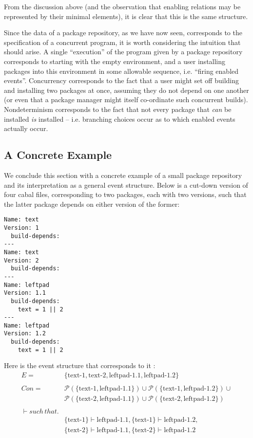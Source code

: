 \documentclass[hoptionsi,review,screen,format=sigconf]{acmart}
\theoremstyle{definition}
\newcommand{\Pc}{\mathcal{P}}
\begin{document}
From the discussion above (and the observation that enabling relations may be represented by their minimal elements), it is clear that this is the same structure.

Since the data of a package repository, as we have now seen, corresponds to the specification of a concurrent program, it is worth considering the intuition that should arise. A single ``execution'' of the program given by a package repository corresponds to starting with the empty environment, and a user installing packages into this environment in some allowable sequence, i.e. ``firing enabled events''. Concurrency corresponds to the fact that a user might set off building and installing two packages at once, assuming they do not depend on one another (or even that a package manager might itself co-ordinate such concurrent builds). Nondeterminism corresponds to the fact that not every package that \textit{can} be installed \textit{is} installed -- i.e. branching choices occur as to which enabled events actually occur.

\subsection{A Concrete Example}

We conclude this section with a concrete example of a small package repository and its interpretation as a general event structure. Below is a cut-down version of four cabal files, corresponding to two packages, each with two versions, such that the latter package depends on either version of the former:

\begin{verbatim}
Name: text
Version: 1
  build-depends: 
---
Name: text
Version: 2
  build-depends: 
---
Name: leftpad
Version: 1.1
  build-depends: 
    text = 1 || 2
---
Name: leftpad
Version: 1.2
  build-depends: 
    text = 1 || 2
\end{verbatim}


Here is the event structure that corresponds to it :
\begin{equation*}
\begin{aligned}
E  = & \{\mathrm{text\text{-}1},\mathrm{text\text{-}2},\mathrm{leftpad\text{-}1.1},\mathrm{leftpad\text{-}1.2}\}
\\\\
Con = & \Pc(\{\mathrm{text\text{-}1},\mathrm{leftpad\text{-}1.1}\}) \cup \Pc(\{\mathrm{text\text{-}1},\mathrm{leftpad\text{-}1.2}\}) \cup
\\ &\Pc(\{\mathrm{text\text{-}2},\mathrm{leftpad\text{-}1.1}\}) \cup \Pc(\{\mathrm{text\text{-}2},\mathrm{leftpad\text{-}1.2}\})
\\\\
\vdash such \, that. 
\\ & \{\mathrm{text\text{-}1}\} \vdash \mathrm{leftpad\text{-}1.1}, \{\mathrm{text\text{-}1}\} \vdash \mathrm{leftpad\text{-}1.2}, 
\\ & \{\mathrm{text\text{-}2}\} \vdash \mathrm{leftpad\text{-}1.1}, \{\mathrm{text\text{-}2}\} \vdash \mathrm{leftpad\text{-}1.2}
\end{aligned}
\end{equation*}
\end{document}

